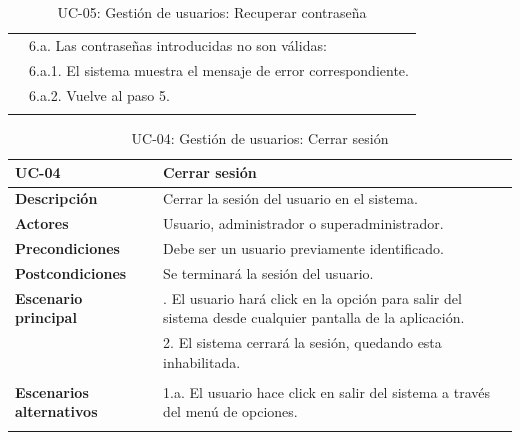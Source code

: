 \begin{table}
\begin{center}
\begin{tabularx}{16.4cm}{|l|X|}
      & 6.a. Las contraseñas introducidas no son válidas:\\
      & \hspace{0.3cm} 6.a.1. El sistema muestra el mensaje de error correspondiente.\\
      & \hspace{0.3cm} 6.a.2. Vuelve al paso 5.\\
      & \\
      \hline
    \end{tabularx}
    \caption{UC-05: Gestión de usuarios: Recuperar contraseña}
    \label{tab:CU-restablecer-contrasena}
  \end{center}
\end{table}


\begin{table}[H]
  \begin{center}
    \begin{tabularx}{16.4cm}{|l|X|}
      \hline
      \textbf{UC-04} & \textbf{Cerrar sesión}\\
      \hline
      \textbf{Descripción} & Cerrar la sesión del usuario en el sistema.\\
      \hline
      \textbf{Actores} & Usuario, administrador o superadministrador.\\
      \hline
      \textbf{Precondiciones} & Debe ser un usuario previamente identificado.\\
      \hline
      \textbf{Postcondiciones} & Se terminará la sesión del usuario.\\
      \hline
      \textbf{Escenario principal} & \smallskip 1. El usuario hará click en la opción para salir del sistema desde cualquier pantalla de la aplicación.\\
      & 2. El sistema cerrará la sesión, quedando esta inhabilitada.\\
      & \\
      \hline
      \textbf{Escenarios alternativos} & \smallskip 1.a. El usuario hace click en salir del sistema a través del menú de opciones.\\
      & \\
      \hline
    \end{tabularx}
    \caption{UC-04: Gestión de usuarios: Cerrar sesión}
    \label{tab:CU-cerrar-sesion}
  \end{center}
\end{table}


